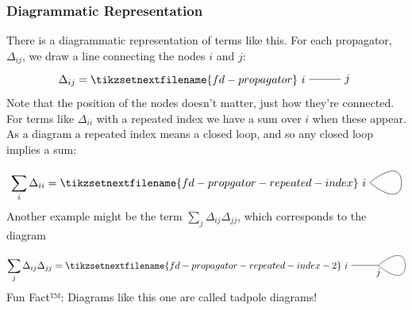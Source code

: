 \documentclass[fleqn]{NotesClass}
\begin{document}
    \subsubsection{Diagrammatic Representation}
    There is a diagrammatic representation of terms like this.
    For each propagator, \(\Delta_{ij}\), we draw a line connecting the nodes \(i\) and \(j\):
    \begin{equation}
        \Delta_{ij} = 
        \tikzsetnextfilename{fd-propagator}
        \begin{tikzpicture}[baseline=(i.base)]
            \draw (0, 0) node[left] (i) {\(i\)} -- (1, 0) node[right] {\(j\)};
        \end{tikzpicture}
    \end{equation}
    Note that the position of the nodes doesn't matter, just how they're connected.
    For terms like \(\Delta_{ii}\) with a repeated index we have a sum over \(i\) when these appear.
    As a diagram a repeated index means a closed loop, and so any closed loop implies a sum:
    \begin{equation}
        \sum_i \Delta_{ii} = 
        \tikzsetnextfilename{fd-propgator-repeated-index}
        \begin{tikzpicture}[baseline=(i.base)]
            \draw[looseness=1.5] (0, 0) to[out=40, in=90] (1, 0) to[out=270, in=-40] (0, 0) node [left] (i) {\(i\)};
        \end{tikzpicture}
    \end{equation}
    Another example might be the term \(\sum_{j}\Delta_{ij}\Delta_{jj}\), which corresponds to the diagram
    \begin{equation}
        \sum_j \Delta_{ij}\Delta_{jj} = 
        \tikzsetnextfilename{fd-propagator-repeated-index-2}
        \begin{tikzpicture}[baseline=(i.base)]
            \draw[looseness=1.5] (0, 0) node[left] (i) {\(i\)} -- (1, 0) to[out=40, in=90] (2, 0) to[out=270, in=-40] (1, 0) node [below] {\(j\)};
        \end{tikzpicture}
    \end{equation}
    Fun Fact™: Diagrams like this one are called tadpole diagrams!
    
\end{document}
